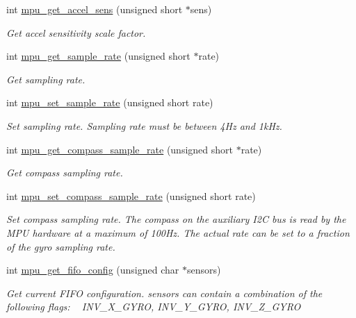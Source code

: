 \begin{DoxyCompactItemize}
int \hyperlink{group___d_r_i_v_e_r_s_ga620408949052b96e856cad920f856583}{mpu\+\_\+get\+\_\+accel\+\_\+sens} (unsigned short $\ast$sens)
\begin{DoxyCompactList}\small\item\em Get accel sensitivity scale factor. \end{DoxyCompactList}\item 
int \hyperlink{group___d_r_i_v_e_r_s_ga2487dd551b701c1c7ed4d6335f02b2f1}{mpu\+\_\+get\+\_\+sample\+\_\+rate} (unsigned short $\ast$rate)
\begin{DoxyCompactList}\small\item\em Get sampling rate. \end{DoxyCompactList}\item 
int \hyperlink{group___d_r_i_v_e_r_s_ga0144d666a67a82888b8580002afe8b55}{mpu\+\_\+set\+\_\+sample\+\_\+rate} (unsigned short rate)
\begin{DoxyCompactList}\small\item\em Set sampling rate. Sampling rate must be between 4\+Hz and 1k\+Hz. \end{DoxyCompactList}\item 
int \hyperlink{group___d_r_i_v_e_r_s_gab5a45cd7783f6937788c0decb0b18b16}{mpu\+\_\+get\+\_\+compass\+\_\+sample\+\_\+rate} (unsigned short $\ast$rate)
\begin{DoxyCompactList}\small\item\em Get compass sampling rate. \end{DoxyCompactList}\item 
int \hyperlink{group___d_r_i_v_e_r_s_ga78da3828de0ef9d080c4d03e7bc45e7b}{mpu\+\_\+set\+\_\+compass\+\_\+sample\+\_\+rate} (unsigned short rate)
\begin{DoxyCompactList}\small\item\em Set compass sampling rate. The compass on the auxiliary I2C bus is read by the M\+PU hardware at a maximum of 100\+Hz. The actual rate can be set to a fraction of the gyro sampling rate. \end{DoxyCompactList}\item 
int \hyperlink{group___d_r_i_v_e_r_s_ga093f11eb10b2639a4b9fe344ea348c54}{mpu\+\_\+get\+\_\+fifo\+\_\+config} (unsigned char $\ast$sensors)
\begin{DoxyCompactList}\small\item\em Get current F\+I\+FO configuration. {\itshape sensors} can contain a combination of the following flags\+: ~\newline
 I\+N\+V\+\_\+\+X\+\_\+\+G\+Y\+RO, I\+N\+V\+\_\+\+Y\+\_\+\+G\+Y\+RO, I\+N\+V\+\_\+\+Z\+\_\+\+G\+Y\+RO ~\newline

\end{DoxyCompactList}
\end{DoxyCompactItemize}
